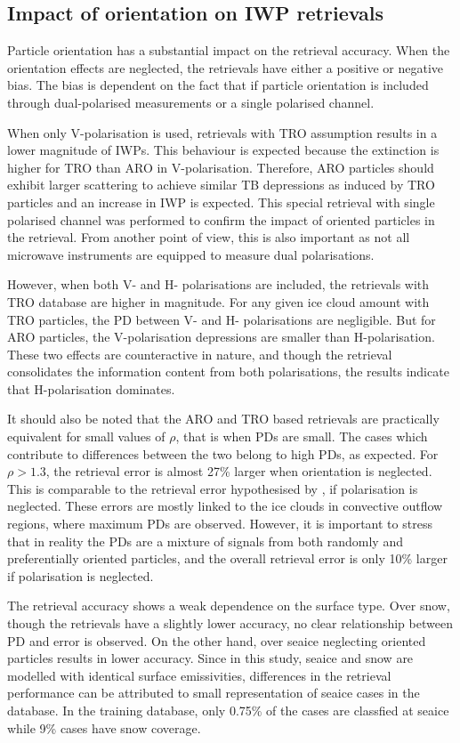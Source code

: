 \documentclass[amt, manuscript]{copernicus}
\begin{document}
\subsection{Impact of orientation on IWP retrievals}
%
Particle orientation has a substantial impact on the retrieval accuracy. When the orientation effects are neglected, the retrievals have either a  positive or negative bias. The bias is dependent on the fact that if particle orientation is included through dual-polarised measurements or a single polarised channel. 

When only V-polarisation is used, retrievals with TRO assumption results in a lower magnitude of IWPs. This behaviour is expected because the extinction is higher for TRO than ARO in V-polarisation. Therefore, ARO particles should exhibit larger scattering to achieve similar TB depressions as induced by TRO particles and an increase in IWP is expected. This special retrieval with single polarised channel was performed to confirm the impact of oriented particles in the retrieval. From another point of view, this is also important as not all microwave instruments are equipped to measure dual polarisations.

However, when both V- and H- polarisations are included, the retrievals with TRO database are higher in magnitude. For any given ice cloud amount with TRO particles, the PD between V- and H- polarisations are negligible. But for ARO particles, the V-polarisation depressions are smaller than H-polarisation. These two effects are counteractive in nature, and though the retrieval consolidates the information content from both polarisations, the results indicate that H-polarisation dominates.

It should also be noted that the ARO and TRO based retrievals are practically equivalent for small values of $\rho$, that is when PDs are small. The cases which contribute to differences between the two belong to high PDs, as expected. For $\rho > 1.3$, the retrieval error is almost 27\% larger when orientation is neglected. This is comparable to the retrieval error hypothesised by \citet{gong:micro:17}, if polarisation is neglected. These errors are mostly linked to the ice clouds in convective outflow regions, where maximum PDs are observed. However, it is important to stress  that in reality the PDs are a mixture of signals from both randomly and preferentially oriented particles, and the overall retrieval error is only 10\% larger if polarisation is neglected. 

The retrieval accuracy shows a weak dependence on the surface type. Over snow, though the retrievals have a slightly lower accuracy, no clear relationship between PD and error is observed. On the other hand, over seaice neglecting oriented particles results in lower accuracy. Since in this study, seaice and snow are modelled with identical surface emissivities, differences in the retrieval performance can be attributed to small representation of seaice cases in the database. In the training database, only 0.75\% of the cases are classfied at seaice while 9\% cases have snow coverage.
\end{document}
